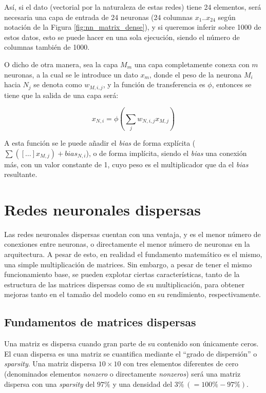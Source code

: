 Así, si el dato (vectorial por la naturaleza de estas redes) tiene 24 elementos, será necesaria una capa de entrada de 24 neuronas (24 columnas $x_{1} .. x_{24}$ según notación de la Figura \ref{fig:nn_matrix_dense}), y si queremos inferir sobre 1000 de estos datos, esto se puede hacer en una sola ejecución, siendo el número de columnas también de 1000.

O dicho de otra manera, sea la capa $M_{m}$ una capa completamente conexa con $m$ neuronas, a la cual se le introduce un dato $x_{m}$, donde el peso de la neurona $M_{i}$ hacia $N_{j}$ se denota como $w_{M,i,j}$, y la función de transferencia es $\phi$, entonces se tiene que la salida de una capa será:

\begin{equation}
    x_{N,i} = \phi\left(\sum_{j}w_{N,i,j}x_{M,j}\right)\nonumber
    \label{eq:dense_nn_eq}
\end{equation}

A esta función se le puede añadir el \textit{bias} de forma explícita ($\sum\left([\dots] x_{M,j}\right) + bias_{N,i}$), o de forma implícita, siendo el \textit{bias} una conexión más, con un valor constante de 1, cuyo peso es el multiplicador que da el \textit{bias} resultante.

\section{Redes neuronales dispersas}
\label{sec:redes_reuronales_dispersas}
Las redes neuronales dispersas cuentan con una ventaja, y es el menor número de conexiones entre neuronas, o directamente el menor número de neuronas en la arquitectura. A pesar de esto, en realidad el fundamento matemático es el mismo, una simple multiplicación de matrices. Sin embargo, a pesar de tener el mismo funcionamiento base, se pueden explotar ciertas características, tanto de la estructura de las matrices dispersas como de su multiplicación, para obtener mejoras tanto en el tamaño del modelo como en su rendimiento, respectivamente.

\subsection{Fundamentos de matrices dispersas}
\label{ssec:fundamentos_matrices_dispersas}
Una matriz es dispersa cuando gran parte de su contenido son únicamente ceros. El cuan dispersa es una matriz se cuantifica mediante el ``grado de dispersión'' o \textit{sparsity}. Una matriz dispersa $10 \times 10$ con tres elementos diferentes de cero (denominados elementos \textit{nonzero} o directamente \textit{nonzeros}) será una matriz dispersa con una \textit{sparsity} del $97\%$ y una densidad del $3\% \:(=100\%-97\%)$.

